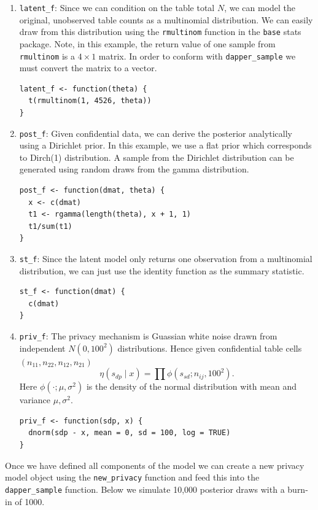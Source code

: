 \begin{enumerate}
\def\labelenumi{\arabic{enumi}.}
\item
  \texttt{latent\_f}: Since we can condition on the table total \(N\), we can model the original, unobserved table counts as a multinomial
  distribution. We can easily draw from this distribution using the
  \texttt{rmultinom} function in the \texttt{base} stats package. Note, in this example,
  the return value of one sample from \texttt{rmultinom} is a \(4 \times 1\) matrix. In order to
  conform with \texttt{dapper\_sample} we must convert the matrix to a vector.

\begin{verbatim}
latent_f <- function(theta) {
  t(rmultinom(1, 4526, theta))
}
\end{verbatim}
\item
  \texttt{post\_f}: Given confidential data, we can derive the posterior analytically
  using a Dirichlet prior. In this example, we use a flat prior which
  corresponds to Dirch(1) distribution. A sample from the Dirichlet distribution
  can be generated using random draws from the gamma distribution.

\begin{verbatim}
post_f <- function(dmat, theta) {
  x <- c(dmat)
  t1 <- rgamma(length(theta), x + 1, 1)
  t1/sum(t1)
}
\end{verbatim}
\item
  \texttt{st\_f}: Since the latent model only returns one observation from a multinomial
  distribution, we can just use the identity function as the summary statistic.

\begin{verbatim}
st_f <- function(dmat) {
  c(dmat)
}
\end{verbatim}
\item
  \texttt{priv\_f}: The privacy mechanism is Guassian white noise drawn from independent \(N(0,100^2)\) distributions. Hence given
  confidential table cells \((n_{11}, n_{22}, n_{12}, n_{21})\)
  \[
  \eta(s_{dp} \mid x) = \prod \phi(s_{sd}; n_{ij}, 100^2).
  \]
  Here \(\phi(\cdot;\mu,\sigma^2)\) is the density of the normal distribution
  with mean and variance \(\mu,\sigma^2\).

\begin{verbatim}
priv_f <- function(sdp, x) {
  dnorm(sdp - x, mean = 0, sd = 100, log = TRUE)
}
\end{verbatim}
\end{enumerate}

Once we have defined all components of the model we can
create a new privacy model object using the \texttt{new\_privacy} function and
feed this into the \texttt{dapper\_sample} function. Below we simulate 10,000 posterior
draws with a burn-in of 1000.

